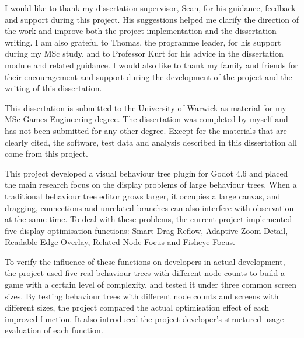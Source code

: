 \frontmatter


\tableofcontents
\clearforchapter\listoffigures
\clearforchapter\listoftables


I would like to thank my dissertation supervisor, Sean, for his guidance, feedback and support during this project. His suggestions helped me clarify the direction of the work and improve both the project implementation and the dissertation writing. I am also grateful to Thomas, the programme leader, for his support during my MSc study, and to Professor Kurt for his advice in the dissertation module and related guidance. I would also like to thank my family and friends for their encouragement and support during the development of the project and the writing of this dissertation.


This dissertation is submitted to the University of Warwick as material for my MSc Games Engineering degree. The dissertation was completed by myself and has not been submitted for any other degree. Except for the materials that are clearly cited, the software, test data and analysis described in this dissertation all come from this project.


This project developed a visual behaviour tree plugin for Godot 4.6 and placed the main research focus on the display problems of large behaviour trees. When a traditional behaviour tree editor grows larger, it occupies a large canvas, and dragging, connections and unrelated branches can also interfere with observation at the same time. To deal with these problems, the current project implemented five display optimisation functions: Smart Drag Reflow, Adaptive Zoom Detail, Readable Edge Overlay, Related Node Focus and Fisheye Focus.

To verify the influence of these functions on developers in actual development, the project used five real behaviour trees with different node counts to build a game with a certain level of complexity, and tested it under three common screen sizes. By testing behaviour trees with different node counts and screens with different sizes, the project compared the actual optimisation effect of each improved function. It also introduced the project developer's structured usage evaluation of each function.

